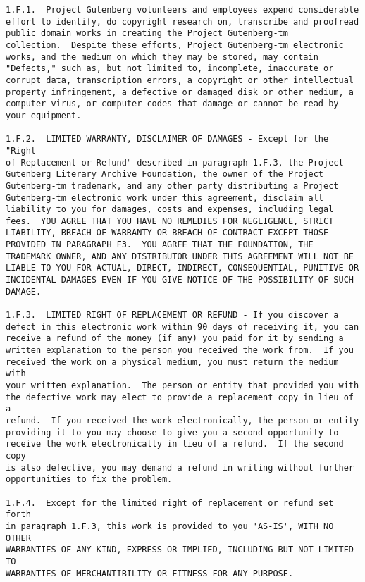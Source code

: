 \documentclass[oneside,12pt]{book}
\begin{document}
\begin{verbatim}
1.F.1.  Project Gutenberg volunteers and employees expend considerable
effort to identify, do copyright research on, transcribe and proofread
public domain works in creating the Project Gutenberg-tm
collection.  Despite these efforts, Project Gutenberg-tm electronic
works, and the medium on which they may be stored, may contain
"Defects," such as, but not limited to, incomplete, inaccurate or
corrupt data, transcription errors, a copyright or other intellectual
property infringement, a defective or damaged disk or other medium, a
computer virus, or computer codes that damage or cannot be read by
your equipment.

1.F.2.  LIMITED WARRANTY, DISCLAIMER OF DAMAGES - Except for the "Right
of Replacement or Refund" described in paragraph 1.F.3, the Project
Gutenberg Literary Archive Foundation, the owner of the Project
Gutenberg-tm trademark, and any other party distributing a Project
Gutenberg-tm electronic work under this agreement, disclaim all
liability to you for damages, costs and expenses, including legal
fees.  YOU AGREE THAT YOU HAVE NO REMEDIES FOR NEGLIGENCE, STRICT
LIABILITY, BREACH OF WARRANTY OR BREACH OF CONTRACT EXCEPT THOSE
PROVIDED IN PARAGRAPH F3.  YOU AGREE THAT THE FOUNDATION, THE
TRADEMARK OWNER, AND ANY DISTRIBUTOR UNDER THIS AGREEMENT WILL NOT BE
LIABLE TO YOU FOR ACTUAL, DIRECT, INDIRECT, CONSEQUENTIAL, PUNITIVE OR
INCIDENTAL DAMAGES EVEN IF YOU GIVE NOTICE OF THE POSSIBILITY OF SUCH
DAMAGE.

1.F.3.  LIMITED RIGHT OF REPLACEMENT OR REFUND - If you discover a
defect in this electronic work within 90 days of receiving it, you can
receive a refund of the money (if any) you paid for it by sending a
written explanation to the person you received the work from.  If you
received the work on a physical medium, you must return the medium with
your written explanation.  The person or entity that provided you with
the defective work may elect to provide a replacement copy in lieu of a
refund.  If you received the work electronically, the person or entity
providing it to you may choose to give you a second opportunity to
receive the work electronically in lieu of a refund.  If the second copy
is also defective, you may demand a refund in writing without further
opportunities to fix the problem.

1.F.4.  Except for the limited right of replacement or refund set forth
in paragraph 1.F.3, this work is provided to you 'AS-IS', WITH NO OTHER
WARRANTIES OF ANY KIND, EXPRESS OR IMPLIED, INCLUDING BUT NOT LIMITED TO
WARRANTIES OF MERCHANTIBILITY OR FITNESS FOR ANY PURPOSE.


\end{verbatim}
\end{document}
